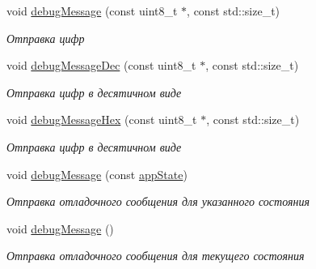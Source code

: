 \begin{DoxyCompactItemize}
void \hyperlink{classapp_1_1_t_application_a9f4f8b1ef208edca2c5ea5ef1851efca}{debug\+Message} (const uint8\+\_\+t $\ast$, const std\+::size\+\_\+t)
\begin{DoxyCompactList}\small\item\em Отправка цифр \end{DoxyCompactList}\item 
\mbox{\label{classapp_1_1_t_application_a27c63bfb10aff853d0231c18df229c4c}} 
void \hyperlink{classapp_1_1_t_application_a27c63bfb10aff853d0231c18df229c4c}{debug\+Message\+Dec} (const uint8\+\_\+t $\ast$, const std\+::size\+\_\+t)
\begin{DoxyCompactList}\small\item\em Отправка цифр в десятичном виде \end{DoxyCompactList}\item 
\mbox{\label{classapp_1_1_t_application_a51545d51e9a81883df7791d8965da74f}} 
void \hyperlink{classapp_1_1_t_application_a51545d51e9a81883df7791d8965da74f}{debug\+Message\+Hex} (const uint8\+\_\+t $\ast$, const std\+::size\+\_\+t)
\begin{DoxyCompactList}\small\item\em Отправка цифр в десятичном виде \end{DoxyCompactList}\item 
void \hyperlink{classapp_1_1_t_application_ade46529292a73f5184abb54b135c4a2e}{debug\+Message} (const \hyperlink{namespaceapp_a290e8080c661e52c2f685fd4af148acf}{app\+State})
\begin{DoxyCompactList}\small\item\em Отправка отладочного сообщения для указанного состояния \end{DoxyCompactList}\item 
\mbox{\label{classapp_1_1_t_application_a63da2a3bd444ed62efa0e35ae5f0571d}} 
void \hyperlink{classapp_1_1_t_application_a63da2a3bd444ed62efa0e35ae5f0571d}{debug\+Message} ()
\begin{DoxyCompactList}\small\item\em Отправка отладочного сообщения для текущего состояния \end{DoxyCompactList}\item 
\mbox{\label{classapp_1_1_t_application_a2976114a4d6cb5ae83b28459e7a2aa70}} 

\end{DoxyCompactItemize}
